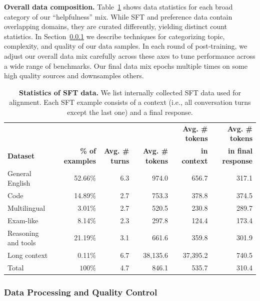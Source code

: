 \documentclass[dvipsnames]{fairmeta}
\begin{document}
\textbf{Overall data composition.} Table~\ref{tab:sft_data} shows data statistics for each broad category of our ``helpfulness'' mix. 
While SFT and preference data contain overlapping domains, they are curated differently, yielding distinct count statistics. In Section~\ref{subsubsec:data_clean} we describe techniques for categorizing topic, complexity, and quality of our data samples. In each round of post-training, we adjust our overall data mix carefully across these axes to tune performance across a wide range of benchmarks. Our final data mix epochs multiple times on some high quality sources and downsamples others.

\begin{table}[t]
  \centering
  \setlength{\tabcolsep}{4pt}
   {
  \begin{tabular}{@{}l@{\hspace*{0mm}}rrrrr@{}}
    \toprule
      & & & & \textbf{Avg. \# tokens} & \textbf{Avg. \# tokens} \\
     \textbf{Dataset} & \textbf{\% of examples} & \textbf{Avg. \# turns} & \textbf{Avg. \# tokens} & \textbf{in context} & \textbf{in final response} \\
   \midrule
   General English & 52.66\% & 6.3 & 974.0 & 656.7 & 317.1\\
    Code & 14.89\% & 2.7 & 753.3 &  378.8  & 374.5 \\
    Multilingual & 3.01\% & 2.7 & 520.5 & 230.8 & 289.7 \\
    Exam-like & 8.14\% & 2.3 & 297.8 &  124.4 & 173.4 \\
    Reasoning and tools & 21.19\% & 3.1  & 661.6 & 359.8 & 301.9 \\
    Long context & 0.11\% & 6.7 & 38,135.6 & 37,395.2 & 740.5 \\
    \midrule
    Total & $100\%$ & 4.7 & 846.1 & 535.7 & 310.4 \\
    \bottomrule
  \end{tabular}}
  \vspace{0.3cm}
  \caption{\textbf{Statistics of SFT data.} We list internally collected SFT data used for \llamathree alignment. Each SFT example consists of a context (i.e., all conversation turns except the last one) and a final response.}
  \label{tab:sft_data}
\end{table}

\subsubsection{Data Processing and Quality Control}
\label{subsubsec:data_clean} 
\end{document}

